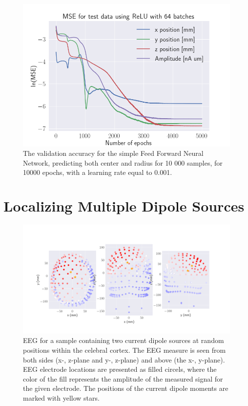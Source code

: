 \documentclass[a4paper, UKenglish, 11pt]{uiomaster}
\begin{document}
\begin{figure}[!htb]
    \centering
    \includegraphics[width=\linewidth]{figures/mse_targets_50000_26junemseloss_MSE_area_w_amplitude_5000_SGD_lr0.001_wd0.1_mom0.35_bs64.png}
    \caption{The validation accuracy for the simple Feed Forward Neural Network, predicting both center and radius for 10 000 samples, for 10000 epochs, with a learning rate equal to 0.001.}
    \label{fig:dipole_area_result}
\end{figure}





\section{Localizing Multiple Dipole Sources}
\begin{figure}[!htb]
    \centering
    \includegraphics[width=\linewidth]{../Code/plots/finals/eeg_field_2_2.png}
    \caption{EEG for a sample containing two current dipole sources at random positions within the celebral cortex. The EEG measure is seen from both sides (x-, z-plane and y-, z-plane) and above (the x-, y-plane). EEG electrode locations are presented as filled circels, where the color of the fill represents the amplitude of the measured signal for the given electrode. The positions of the current dipole moments are marked with yellow stars.}
    \label{fig:dipole_area_result}
\end{figure}
\end{document}
